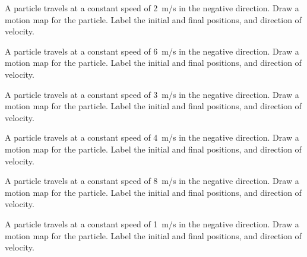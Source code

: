 \documentclass[]{exam}
\begin{document}
\begin{questions}

\question \label{6NK1K}
A particle travels at a constant  speed of \SI{2}{m/s} in the negative direction. Draw a motion map for the particle. Label the initial and final positions, and direction of velocity.

\begin{center}
\end{center}

\question
A particle travels at a constant  speed of \SI{6}{m/s} in the negative direction. Draw a motion map for the particle. Label the initial and final positions, and direction of velocity.

\begin{center}
\end{center}

\question
A particle travels at a constant  speed of \SI{3}{m/s} in the negative direction. Draw a motion map for the particle. Label the initial and final positions, and direction of velocity.

\begin{center}
\end{center}

\question
A particle travels at a constant  speed of \SI{4}{m/s} in the negative direction. Draw a motion map for the particle. Label the initial and final positions, and direction of velocity.

\begin{center}
\end{center}

\question 
A particle travels at a constant  speed of \SI{8}{m/s} in the negative direction. Draw a motion map for the particle. Label the initial and final positions, and direction of velocity.

\begin{center}
\end{center}

\question \label{dr2on}
A particle travels at a constant  speed of \SI{1}{m/s} in the negative direction. Draw a motion map for the particle. Label the initial and final positions, and direction of velocity.

\begin{center}
\end{center}
\end{questions}
\end{document}
